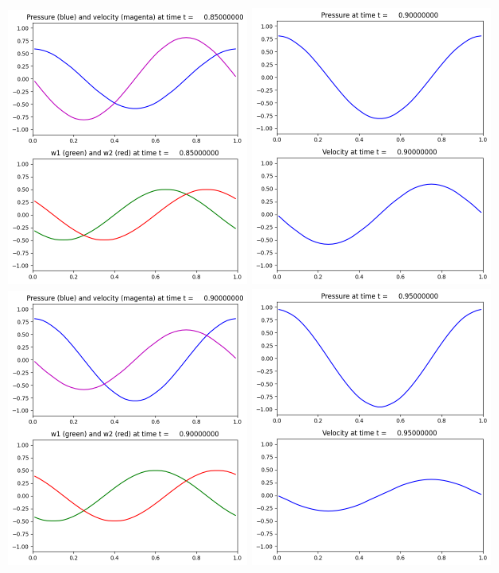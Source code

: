 \documentclass[11pt]{article}
\begin{document}
\includegraphics[width=0.475\textwidth]{frame0017fig2.png}
\vskip 10pt 
\includegraphics[width=0.475\textwidth]{frame0018fig1.png}
\includegraphics[width=0.475\textwidth]{frame0018fig2.png}
\vskip 10pt 
\includegraphics[width=0.475\textwidth]{frame0019fig1.png}
\end{document}
